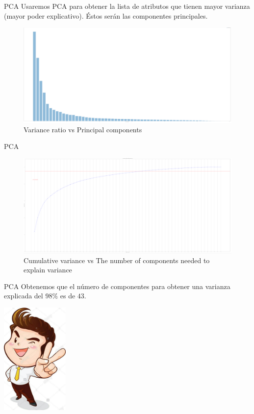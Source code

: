 \documentclass[11pt]{beamer}
\begin{document}
\begin{frame}{PCA}
    \justifying
    Usaremos PCA para obtener la lista de atributos que tienen mayor varianza 
    (mayor poder explicativo). Éstos serán las componentes principales.
    \begin{figure}
        \includegraphics[width=1\textwidth]{imagenes/components1.png}
        \caption{Variance ratio vs Principal components}
    \end{figure}
\end{frame}
		
\begin{frame}{PCA}
\justifying
\begin{figure}
    \includegraphics[width=1\textwidth]{imagenes/components2.png}
    \caption{Cumulative variance vs The number of components needed to explain variance}
\end{figure}
\end{frame}

\begin{frame}{PCA}
\justifying
Obtenemos que el número de componentes para obtener una varianza explicada 
del $98\%$ es de $43$.
\begin{center}
    \includegraphics[width=0.25\textwidth]{imagenes/componentes3.jpg}
\end{center}
\end{frame}
\end{document}

